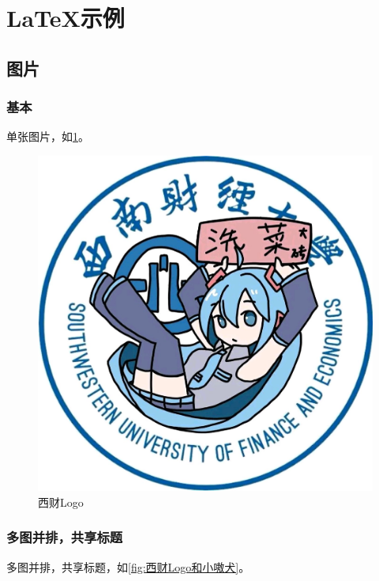 \section{LaTeX示例}
\setcounter{figure}{0}
\setcounter{table}{0}

\subsection{图片}

\subsubsection{基本}

单张图片，如\cref{fig:西财Logo单图}。

\begin{figure}[htb]
\centering
\includegraphics[width=0.3\linewidth]{img/swufe_logo.jpg}
\caption{西财Logo}
\label{fig:西财Logo单图}
\end{figure}

\subsubsection{多图并排，共享标题}

多图并排，共享标题，如\cref{fig:西财Logo和小嗷犬}。

